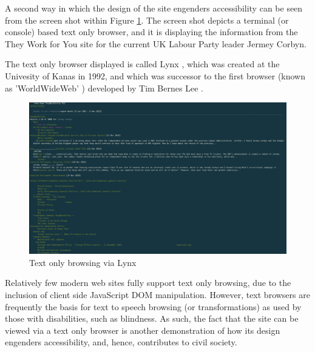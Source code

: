 A second way in which the design of the site engenders accessibility can be seen from the screen shot within Figure \ref{fig:they-work-for-you-implementation-text-only-lynx}.
The screen shot depicts a terminal (or console) based text only browser, and it is displaying the information from the They Work for You site for the current UK Labour Party leader Jermey Corbyn.

\pagebreak
The text only browser displayed is called Lynx \cite{lynx}, which was created at the Univesity of Kanas in 1992, and which was successor to the first browser (known as 'WorldWideWeb' \cite{browser-history}) developed by Tim Bernes Lee \cite{tim-berners-lee}.

\begin{figure}
  \centering
  \includegraphics[scale=0.10]{images/they-work-for-you-implementation-text-only-lynx}
  \caption{Text only browsing via Lynx}
  \label{fig:they-work-for-you-implementation-text-only-lynx}
\end{figure}

Relatively few modern web sites fully support text only browsing, due to the inclusion of client side JavaScript DOM manipulation.
However, text browsers are frequently the basis for text to speech browsing (or transformations) as used by those with disabilities, such as blindness.
As such, the fact that the site can be viewed via a text only browser is another demonstration of how its design engenders accessibility, and, hence, contributes to civil society.
